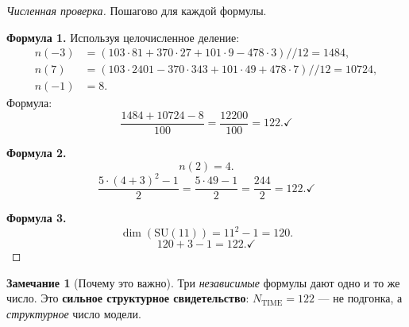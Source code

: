 \documentclass[11pt,a4paper]{article}
\newcommand{\SU}{\mathrm{SU}}
\theoremstyle{definition}
\newtheorem{remark}[theorem]{Замечание}
\begin{document}
\begin{proof}[Численная проверка]
Пошагово для каждой формулы.

\medskip\noindent
\textbf{Формула 1.} Используя целочисленное деление:
\begin{align}
    n(-3) &= (103 \cdot 81 + 370 \cdot 27 + 101 \cdot 9 
    - 478 \cdot 3) // 12 = 1484, \\
    n(7) &= (103 \cdot 2401 - 370 \cdot 343 + 101 \cdot 49 
    + 478 \cdot 7) // 12 = 10724, \\
    n(-1) &= 8.
\end{align}
Формула:
\begin{equation}
    \frac{1484 + 10724 - 8}{100} = \frac{12200}{100} = 122. \checkmark
\end{equation}

\medskip\noindent
\textbf{Формула 2.}
\begin{equation}
    n(2) = 4.
\end{equation}
\begin{equation}
    \frac{5 \cdot (4 + 3)^2 - 1}{2} = \frac{5 \cdot 49 - 1}{2} 
    = \frac{244}{2} = 122. \checkmark
\end{equation}

\medskip\noindent
\textbf{Формула 3.}
\begin{equation}
    \dim(\SU(11)) = 11^2 - 1 = 120.
\end{equation}
\begin{equation}
    120 + 3 - 1 = 122. \checkmark
\end{equation}
\end{proof}

\begin{remark}[Почему это важно]
\label{rem:ntime-important}
Три \emph{независимые} формулы дают одно и то же число. Это 
\textbf{сильное структурное свидетельство}: $N_{\text{TIME}} = 122$ — 
не подгонка, а \emph{структурное} число модели.
\end{remark}
\end{document}
